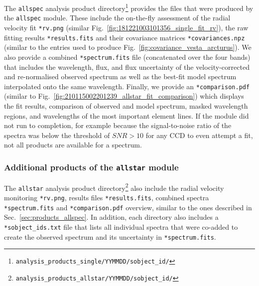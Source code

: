 \documentclass[
  journal=pasa,
  manuscript=research-paper, %
  year=2024,
  volume=37
]{cup-journal}
\begin{document}
The \texttt{allspec} analysis product directory\footnote{\texttt{analysis\_products\_single/YYMMDD/sobject\_id/}} provides the files that were produced by the \texttt{allspec} module. These include the on-the-fly assessment of the radial velocity fit \texttt{*rv.png} (similar Fig.~\ref{fig:181221003101356_single_fit_rv}), the raw fitting results \texttt{*results.fits} and their covariance matrices \texttt{*covariances.npz} (similar to the entries used to produce Fig.~\ref{fig:covariance_vesta_arcturus}). We also provide a combined \texttt{*spectrum.fits} file (concatenated over the four bands) that includes the wavelength, flux, and flux uncertainty of the velocity-corrected and re-normalised observed spectrum as well as the best-fit model spectrum interpolated onto the same wavelength. Finally, we provide an \texttt{*comparison.pdf} (similar to Fig.~\ref{fig:210115002201239_allstar_fit_comparison}) which displays the fit results, comparison of observed and model spectrum, masked wavelength regions, and wavelengths of the most important element lines. If the module did not run to completion, for example because the signal-to-noise ratio of the spectra was below the threshold of $SNR > 10$ for any CCD to even attempt a fit, not all products are available for a spectrum.

\subsubsection{Additional products of the \texttt{allstar} module} \label{sec:products_allstar}

The \texttt{allstar} analysis product directory\footnote{\texttt{analysis\_products\_allstar/YYMMDD/sobject\_id/}} also include the radial velocity monitoring \texttt{*rv.png}, results files  \texttt{*results.fits}, combined spectra \texttt{*spectrum.fits} and \texttt{*comparison.pdf} overview, similar to the ones described in Sec.~\ref{sec:products_allspec}. In addition, each directory also includes a \texttt{*sobject\_ids.txt} file that lists all individual spectra that were co-added to create the observed spectrum and its uncertainty in \texttt{*spectrum.fits}.

\end{document}
